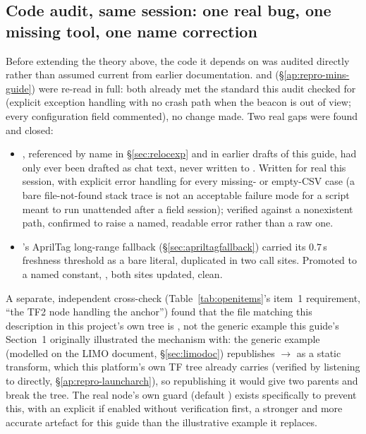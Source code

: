 \subsection{Code audit, same session: one real bug, one missing tool, one
name correction}
\label{sec:aug12readiness}
Before extending the theory above, the code it depends on was audited
directly rather than assumed current from earlier documentation.
 and 
(\S\ref{ap:repro-mins-guide}) were re-read in full: both already met the
standard this audit checked for (explicit exception handling with no crash
path when the beacon is out of view; every configuration field commented),
no change made. Two real gaps were found and closed:
\begin{itemize}[leftmargin=1.4em]
\item {}, referenced by name in
  \S\ref{sec:relocexp} and in earlier drafts of this guide, had only ever
  been drafted as chat text, never written to . Written for
  real this session, with explicit error handling for every missing- or
  empty-CSV case (a bare file-not-found stack trace is not an acceptable
  failure mode for a script meant to run unattended after a field session);
  verified against a nonexistent path, confirmed to raise a named, readable
  error rather than a raw one.
\item {}'s AprilTag long-range fallback
  (\S\ref{sec:apriltagfallback}) carried its $0.7$\,s freshness threshold as
  a bare literal, duplicated in two call sites. Promoted to a named
  constant, , both sites updated,
   clean.
\end{itemize}
A separate, independent cross-check (Table~\ref{tab:openitems}'s item~1
requirement, ``the TF2 node handling the  anchor'')
found that the file matching this description in this project's own tree is
, not the generic example this guide's
Section~1 originally illustrated the mechanism with: the generic example
(modelled on the LIMO document, \S\ref{sec:limodoc}) republishes
$\to$ as a static transform, which
this platform's own TF tree already carries (verified by listening to
 directly, \S\ref{ap:repro-launcharch}), so republishing it would
give  two parents and break the tree. The real node's own
 guard (default ) exists
specifically to prevent this, with an explicit  if
enabled without verification first, a stronger and more accurate artefact
for this guide than the illustrative example it replaces.

